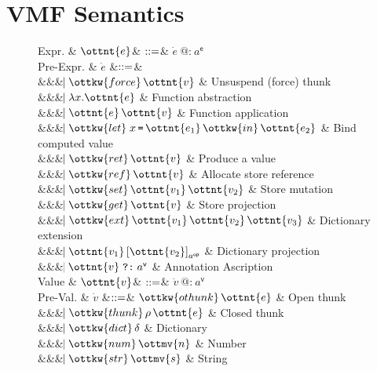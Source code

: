 \section{VMF Semantics}

\begin{figure}
\begin{grammar}
  Expr.     & $\ottnt{e}$& $\mathrel{::=}$& $ \dot{e} ~\texttt{@:}~ a^\textsf{e} $
  \\
  Pre-Expr. & $\dot{e}$
  &$\mathrel{::=}$&
  \\ &&& $\bnfaltbrk \ottkw{force} \, \ottnt{v}$ & Unsuspend (force) thunk
  \\ &&& $\bnfaltbrk  \lambda  x .  \ottnt{e} $ & Function abstraction
  \\ &&& $\bnfaltbrk \ottnt{e} \, \ottnt{v}$ & Function application
  \\ &&& $\bnfaltbrk  \ottkw{let} \; x \,{\texttt{=} }\, \ottnt{e_{{\mathrm{1}}}} \, \ottkw{in} \, \ottnt{e_{{\mathrm{2}}}} $ & Bind computed value
  \\ &&& $\bnfaltbrk \ottkw{ret} \, \ottnt{v}$ & Produce a value
  \\ &&& $\bnfaltbrk \ottkw{ref} \, \ottnt{v}$ & Allocate store reference
  \\ &&& $\bnfaltbrk \ottkw{set} \, \ottnt{v_{{\mathrm{1}}}} \, \ottnt{v_{{\mathrm{2}}}}$ & Store mutation
  \\ &&& $\bnfaltbrk \ottkw{get} \, \ottnt{v}$ & Store projection
  \\ &&& $\bnfaltbrk \ottkw{ext} \, \ottnt{v_{{\mathrm{1}}}} \, \ottnt{v_{{\mathrm{2}}}} \, \ottnt{v_{{\mathrm{3}}}}$ & Dictionary extension
  \\ &&& $\bnfaltbrk  \ottnt{v_{{\mathrm{1}}}} \left[  \ottnt{v_{{\mathrm{2}}}}  \right]_{ a^{\textsf{op} } } $ & Dictionary projection
  \\ &&& $\bnfaltbrk \ottnt{v}  \mathrel{ \texttt{?:} }  a^\textsf{v}$ & Annotation Ascription
  \\[2px]
  Value    & $\ottnt{v}$& $\mathrel{::=}$& $ \dot{v} ~\texttt{@:}~ a^\textsf{v} $
  \\
  Pre-Val. & $\dot{v}$
  &$\mathrel{::=}$&        $\ottkw{othunk} \, \ottnt{e}$    & Open thunk
  \\ &&& $\bnfaltbrk \ottkw{thunk} \, \rho \, \ottnt{e}$ & Closed thunk
  \\ &&& $\bnfaltbrk \ottkw{dict} \, \delta$  & Dictionary
  \\ &&& $\bnfaltbrk \ottkw{num} \, \ottmv{n}$ & Number
  \\ &&& $\bnfaltbrk \ottkw{str} \, \ottmv{s}$ & String

\end{grammar}
\end{figure}
